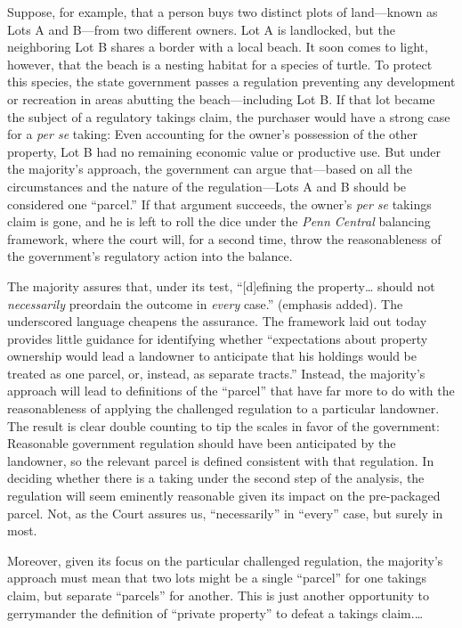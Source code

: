 Suppose, for example, that a person buys two distinct plots of land---known as
Lots A and B---from two different owners. Lot A is landlocked, but the
neighboring Lot B shares a border with a local beach. It soon comes to light,
however, that the beach is a nesting habitat for a species of turtle. To protect
this species, the state government passes a regulation preventing any
development or recreation in areas abutting the beach---including Lot B. If that
lot became the subject of a regulatory takings claim, the purchaser would have a
strong case for a \textit{per se} taking: Even accounting for the owner's
possession of the other property, Lot B had no remaining economic value or
productive use. But under the majority's approach, the government can argue
that---based on all the circumstances and the nature of the regulation---Lots A
and B should be considered one ``parcel.'' If that argument succeeds, the
owner's \textit{per se} takings claim is gone, and he is left to roll the dice
under the \textit{Penn Central} balancing framework, where the court will, for a
second time, throw the reasonableness of the government's regulatory action into
the balance.

The majority assures that, under its test, ``[d]efining the property\ldots
should not \textit{necessarily} preordain the outcome in \textit{every} case.''
(emphasis added). The underscored language cheapens the assurance. The framework
laid out today provides little guidance for identifying whether ``expectations
about property ownership would lead a landowner to anticipate that his holdings
would be treated as one parcel, or, instead, as separate tracts.'' Instead, the
majority's approach will lead to definitions of the ``parcel'' that have far
more to do with the reasonableness of applying the challenged regulation to a
particular landowner. The result is clear double counting to tip the scales in
favor of the government: Reasonable government regulation should have been
anticipated by the landowner, so the relevant parcel is defined consistent with
that regulation. In deciding whether there is a taking under the second step of
the analysis, the regulation will seem eminently reasonable given its impact on
the pre-packaged parcel. Not, as the Court assures us, ``necessarily'' in
``every'' case, but surely in most.

Moreover, given its focus on the particular challenged regulation, the
majority's approach must mean that two lots might be a single ``parcel'' for one
takings claim, but separate ``parcels'' for another. This is just another
opportunity to gerrymander the definition of ``private property'' to defeat a
takings claim.\ldots

